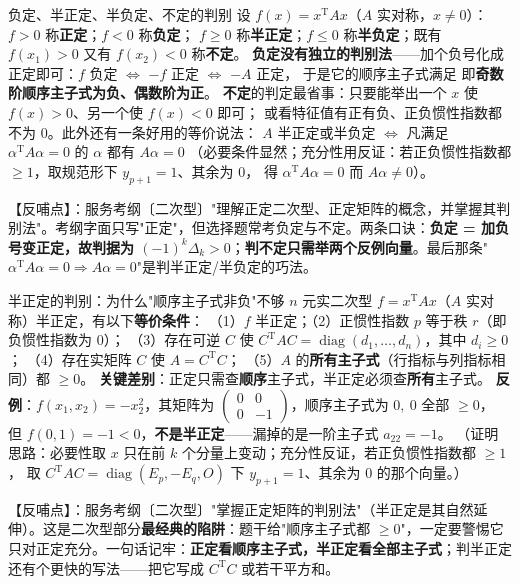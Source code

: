 \begin{fdeep}{负定、半正定、半负定、不定的判别}
设 $f(x)=x^{\mathrm T}Ax$（$A$ 实对称，$x\ne0$）：$f>0$ 称\textbf{正定}；$f<0$ 称\textbf{负定}；
$f\ge0$ 称\textbf{半正定}；$f\le0$ 称\textbf{半负定}；既有 $f(x_1)>0$ 又有 $f(x_2)<0$ 称\textbf{不定}。
\textbf{负定没有独立的判别法}——加个负号化成正定即可：$f$ 负定 $\iff$ $-f$ 正定 $\iff$ $-A$ 正定，
于是它的顺序主子式满足
即\textbf{奇数阶顺序主子式为负、偶数阶为正}。
\textbf{不定}的判定最省事：只要能举出一个 $x$ 使 $f(x)>0$、另一个使 $f(x)<0$ 即可；
或看特征值有正有负、正负惯性指数都不为 $0$。此外还有一条好用的等价说法：
$A$ 半正定或半负定 $\iff$ 凡满足 $\alpha^{\mathrm T}A\alpha=0$ 的 $\alpha$ 都有 $A\alpha=0$
（必要条件显然；充分性用反证：若正负惯性指数都 $\ge1$，取规范形下 $y_{p+1}=1$、其余为 $0$，
得 $\alpha^{\mathrm T}A\alpha=0$ 而 $A\alpha\ne0$）。

【反哺点】：服务考纲〔二次型〕"理解正定二次型、正定矩阵的概念，并掌握其判别法"。考纲字面只写"正定"，但选择题常考负定与不定。两条口诀：\textbf{负定 = 加负号变正定，故判据为 $(-1)^{k}\Delta_k>0$}；\textbf{判不定只需举两个反例向量}。最后那条"$\alpha^{\mathrm T}A\alpha=0\Longrightarrow A\alpha=0$"是判半正定/半负定的巧法。
\end{fdeep}

\begin{fdeep}{半正定的判别：为什么"顺序主子式非负"不够}
$n$ 元实二次型 $f=x^{\mathrm T}Ax$（$A$ 实对称）半正定，有以下\textbf{等价条件}：
（1）$f$ 半正定；（2）正惯性指数 $p$ 等于秩 $r$（即负惯性指数为 $0$）；
（3）存在可逆 $C$ 使 $C^{\mathrm T}AC=\operatorname{diag}(d_1,\dots,d_n)$，其中 $d_i\ge0$；
（4）存在实矩阵 $C$ 使 $A=C^{\mathrm T}C$；
（5）$A$ 的\textbf{所有主子式}（行指标与列指标相同）都 $\ge0$。
\textbf{关键差别}：正定只需查\textbf{顺序}主子式，半正定必须查\textbf{所有}主子式。
\textbf{反例}：$f(x_1,x_2)=-x_2^{2}$，其矩阵为
$\begin{pmatrix}0&0\\0&-1\end{pmatrix}$，顺序主子式为 $0,\ 0$ 全部 $\ge0$，
但 $f(0,1)=-1<0$，\textbf{不是半正定}——漏掉的是一阶主子式 $a_{22}=-1$。
（证明思路：必要性取 $x$ 只在前 $k$ 个分量上变动；充分性反证，若正负惯性指数都 $\ge1$，
取 $C^{\mathrm T}AC=\operatorname{diag}(E_p,-E_q,O)$ 下 $y_{p+1}=1$、其余为 $0$ 的那个向量。）

【反哺点】：服务考纲〔二次型〕"掌握正定矩阵的判别法"（半正定是其自然延伸）。这是二次型部分\textbf{最经典的陷阱}：题干给"顺序主子式都 $\ge0$"，一定要警惕它只对正定充分。一句话记牢：\textbf{正定看顺序主子式，半正定看全部主子式}；判半正定还有个更快的写法——把它写成 $C^{\mathrm T}C$ 或若干平方和。
\end{fdeep}

